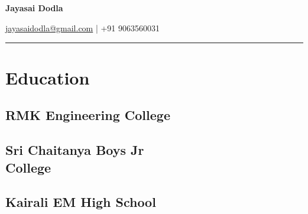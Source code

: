 \documentclass[]{deedy-resume-openfont}
\begin{document}

\begin{center}
    \section{}{ 
        \Large\textbf{Jayasai Dodla}

        \href{mailto:jayasaidodla@gmail.com}{jayasaidodla@gmail.com} | +91 9063560031
    }
    \rule{0.95\textwidth}{0.2pt}
\end{center}

\begin{minipage}[t]{0.33\textwidth}


    \section{Education}

    \subsection{RMK Engineering College}
    \sectionsep

    \subsection{Sri Chaitanya Boys Jr\\ College}

    \sectionsep

    \subsection{Kairali EM High School}
    \sectionsep



\end{minipage}
\end{document}
